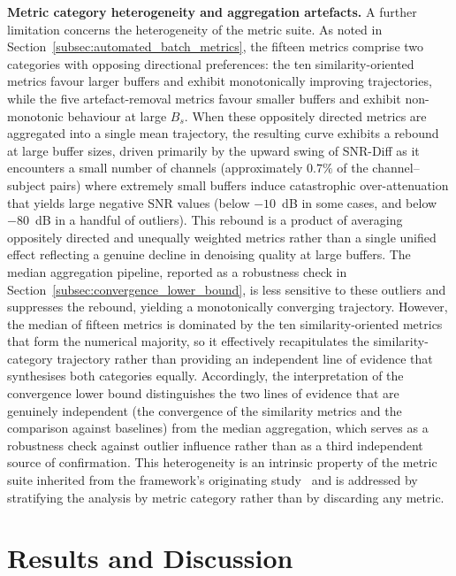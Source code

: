 \documentclass[MScCS,12pt,oneside,final]{uccthesis}
\begin{document}
\textbf{Metric category heterogeneity and aggregation artefacts.} A further limitation concerns the heterogeneity of the metric suite. As noted in Section~\ref{subsec:automated_batch_metrics}, the fifteen metrics comprise two categories with opposing directional preferences: the ten similarity-oriented metrics favour larger buffers and exhibit monotonically improving trajectories, while the five artefact-removal metrics favour smaller buffers and exhibit non-monotonic behaviour at large $B_s$. When these oppositely directed metrics are aggregated into a single mean trajectory, the resulting curve exhibits a rebound at large buffer sizes, driven primarily by the upward swing of SNR-Diff as it encounters a small number of channels (approximately $0.7\%$ of the channel--subject pairs) where extremely small buffers induce catastrophic over-attenuation that yields large negative SNR values (below $-10$~dB in some cases, and below $-80$~dB in a handful of outliers). This rebound is a product of averaging oppositely directed and unequally weighted metrics rather than a single unified effect reflecting a genuine decline in denoising quality at large buffers. The median aggregation pipeline, reported as a robustness check in Section~\ref{subsec:convergence_lower_bound}, is less sensitive to these outliers and suppresses the rebound, yielding a monotonically converging trajectory. However, the median of fifteen metrics is dominated by the ten similarity-oriented metrics that form the numerical majority, so it effectively recapitulates the similarity-category trajectory rather than providing an independent line of evidence that synthesises both categories equally. Accordingly, the interpretation of the convergence lower bound distinguishes the two lines of evidence that are genuinely independent (the convergence of the similarity metrics and the comparison against baselines) from the median aggregation, which serves as a robustness check against outlier influence rather than as a third independent source of confirmation. This heterogeneity is an intrinsic property of the metric suite inherited from the framework's originating study~\parencite{longo2025oneegwavelad} and is addressed by stratifying the analysis by metric category rather than by discarding any metric.

\chapter{Results and Discussion}
\label{chap:results}
\end{document}
